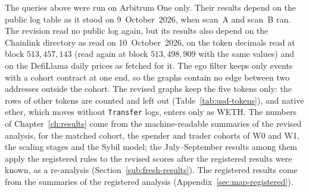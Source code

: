 The queries above were run on Arbitrum One only. Their results depend on the public log table as it stood on 9~October~2026, when scan~A and scan~B ran. The revision read no public log again, but its results also depend on the Chainlink directory as read on 10~October~2026, on the token decimals read at block $513{,}457{,}143$ (read again at block $513{,}498{,}909$ with the same values) and on the DefiLlama daily prices as fetched for it. The ego filter keeps only events with a cohort contract at one end, so the graphs contain no edge between two addresses outside the cohort. The revised graphs keep the five tokens only: the rows of other tokens are counted and left out (Table~\ref{tab:usd-tokens}), and native ether, which moves without \texttt{Transfer} logs, enters only as WETH. The numbers of Chapter~\ref{ch:results} come from the machine-readable summaries of the revised analysis, for the matched cohort, the spender and trader cohorts of W0 and W1, the scaling stages and the Sybil model; the July--September results among them apply the registered rules to the revised scores after the registered results were known, as a re-analysis (Section~\ref{sub:fresh-results}). The registered results come from the summaries of the registered analysis (Appendix~\ref{sec:map-registered}).
